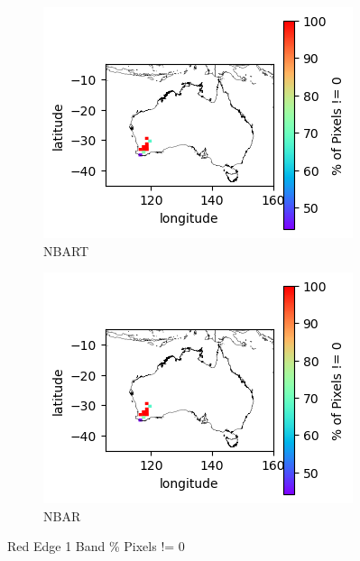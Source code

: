 \documentclass[a4paper]{article}
\begin{document}
      \begin{figure}[h!]
        \centering
          \begin{subfigure}[l]{.4\linewidth}
            \hspace{-32mm}
            \includegraphics[scale=0.9]{plots/nbart/nbart_red_edge_1-PercentDifferent.png}
            \caption{NBART}
          \end{subfigure}
%
          \begin{subfigure}[r]{.4\linewidth}
            \includegraphics[scale=0.9]{plots/nbar/nbar_red_edge_1-PercentDifferent.png}
            \caption{NBAR}
          \end{subfigure}
        \caption{Red Edge 1 Band \% Pixels != 0}\label{figure:27}
      \end{figure}
\end{document}
